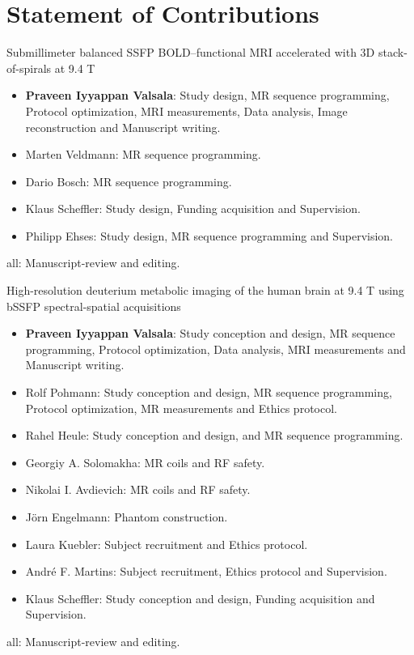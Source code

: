 
\newpage
\chapter{Statement of Contributions}
\begin{enumerate}[label={[\arabic*]}]
	\Large \item Submillimeter balanced SSFP BOLD–functional MRI  accelerated with 3D stack-of-spirals at 9.4 T
	
	\normalsize
	\begin{itemize}
		\item \textbf{Praveen Iyyappan Valsala}: Study design, MR sequence programming, Protocol optimization, MRI measurements, Data analysis, Image reconstruction and Manuscript writing.
		\item Marten Veldmann: MR sequence programming.
		\item Dario Bosch:  MR sequence programming.
		\item Klaus Scheffler: Study design, Funding acquisition and Supervision. 
		\item Philipp Ehses: Study design, MR sequence programming and Supervision.
	\end{itemize}
	all: Manuscript-review and editing.
	\vspace{1cm}
	
	\Large \item  High-resolution deuterium metabolic imaging of the human brain at 9.4 T using bSSFP spectral-spatial acquisitions
	
	\normalsize
	\begin{itemize}
		\item \textbf{Praveen Iyyappan Valsala}: Study conception and design, MR sequence programming, Protocol optimization, Data analysis, MRI measurements and Manuscript writing.
		\item Rolf Pohmann: Study conception and design, MR sequence programming, Protocol optimization, MR measurements and Ethics protocol.
		\item Rahel Heule: Study conception and design, and MR sequence programming.
		\item Georgiy A. Solomakha: MR coils and RF safety.
		\item Nikolai I. Avdievich: MR coils and RF safety. 
		\item Jörn Engelmann: Phantom construction.
		\item Laura Kuebler: Subject recruitment and Ethics protocol.
		\item André F. Martins:  Subject recruitment, Ethics protocol and Supervision.
		\item Klaus Scheffler: Study conception and design, Funding acquisition and Supervision.
	\end{itemize}
	all: Manuscript-review and editing.
	

\end{enumerate}
